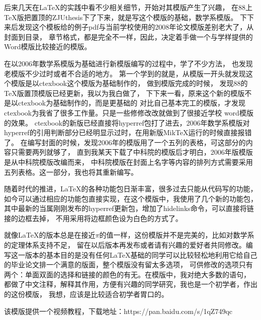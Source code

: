 \begin{preface}
后来几天在\LaTeX{}的实践中看不少相关细节，开始对其模版产生了兴趣，
在88上\TeX{}版把置顶的ZJUthesis下了下来，就是写这个模版的基础，数学系模版。
下下来后发现这个模板给的例子pdf与当前学校使用的2008年论文模版差别老大了，从封面到目录，
章节格式，都是完全不一样，因此，决定着手做一个与学样提供的Word模版比较接近的模版。

在以2006年数学系模版为基础进行新模版编写的过程中，学了不少方法，
也发现老模版不少过时或者不合适的地方。
第一个学到的就是，从模版一开头就发现这个模版是以ctexbook这个模版为基础制作的，
做到模版完成的时候，
发现88的\TeX{}版置顶模版已经更新，我以为我白做了，
下下来一看，原来这个新的模版不是以ctexbook为基础制作的，而是更基础的\LaTeXe\index{\LaTeX}
对比自己基本完工的模版，才发现ctexbook为我省了很多工作量。只是一些修修改改就做到了很接近学校
word模版的效果。
ctexbook的新版已经直接将hyperref包打了进去，2006年数学系模版对hyperref的引用判断部分已经明显示过时，在用新版MikTeX运行的时候直接报错了。
在编写封面的时候，发现2006年的模版用了一个五列的表格，可这部分的内容只需要两列就够了，
直到我某天下载了中科院的模版后才明白，2006年版模版是从中科院模版改编而来，
中科院模版在封面上名字等内容的排列方式需要采用五列表格。这一部分，我也将其重新编写。

随着时代的推进，\LaTeX{}的各种功能包日渐丰富，很多过去只能从\LaTeXe{}代码写的功能，
如今可以通过相应的功能包直接实现，在这个模版中，我使用了几个新的功能包，
其中最新的当属刚刚发布的hyperref更新包，增加了hidelinks命令，可以直接将链接的边框去掉，
不用采用将边框颜色设为白色的方式了。

就像\LaTeX{}的版本总是在接近$\pi$的值一样，这份模版并不是完美的，比如对数学系的定理体系支持不足，
留在以后版本再发布或者请有兴趣的爱好者共同修改。编写这一版本的基本目的是没有任何\LaTeX{}基础的同学可以比较轻松地利用它给自己的毕业论文排一个满意的版面，整个模版没有留太多选项，
可供修改的选项只有两个：单面双面的选择和链接的颜色的有无。在模版中，我对绝大多数的语句，
都做了中文注释，解释其作用，方便有兴趣的同学研究，我也是一个初学者，作出的这份模版，
我想，应该是比较适合初学者胃口的。

该模版提供一个视频教程，下载地址：https://pan.baidu.com/s/1qZ749qc

\end{preface}
